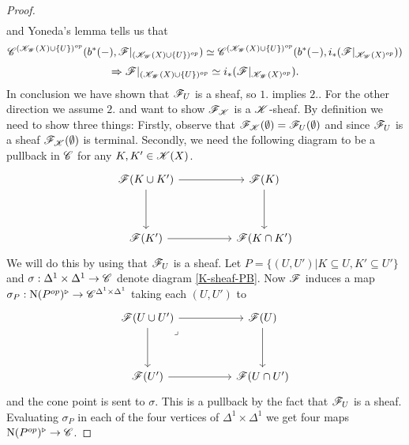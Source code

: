 \documentclass[../../thesis.tex]{subfiles}
\begin{document}
\begin{proof}
\begin{align}
    \end{align}
    and Yoneda's lemma tells us that
    \[\mathscr{C}^{(\mathscr{K}_{\mathscr{W}}(X)\cup \{U\})^{op}}(b^*({-}),\mathscr{F}|_{(\mathscr{K}_{\mathscr{W}}(X)\cup \{U\})^{op}}) \simeq \mathscr{C}^{(\mathscr{K}_{\mathscr{W}}(X)\cup \{U\})^{op}}(b^*({-}), i_*(\mathscr{F}|_{\mathscr{K}_{\mathscr{W}}(X)^{op}}))\]
    \[\Rightarrow \mathscr{F}|_{(\mathscr{K}_{\mathscr{W}}(X)\cup \{U\})^{op}} \simeq i_*(\mathscr{F}|_{\mathscr{K}_{\mathscr{W}}(X)^{op}}).\]
    In conclusion we have shown that $\mathscr{F}_{U}$ is a sheaf, so $1.$ implies $2.$.
    For the other direction we assume $2.$ and want to show $\mathscr{F}_{\mathscr{K}}$ is a $\mathscr{K}$-sheaf. By definition we need to show three things:
    Firstly, observe that $\mathscr{F}_{\mathscr{K}}(\emptyset) = \mathscr{F}_{U}(\emptyset)$ and since $\mathscr{F}_{U}$ is a sheaf $\mathscr{F}_{\mathscr{K}}(\emptyset)$ is terminal.
    Secondly, we need the following diagram to be a pullback in $\mathscr{C}$ for any $K,K' \in \mathscr{K}(X)$.
    \begin{equation}\label{K-sheaf-PB}
        \begin{tikzcd}
            {\F(K \cup K')} && {\F(K)} \\
            \\
            {\F(K')} && {\F(K\cap K')}
            \arrow[from=1-3, to=3-3]
            \arrow[from=3-1, to=3-3]
            \arrow[from=1-1, to=3-1]
            \arrow[from=1-1, to=1-3]
        \end{tikzcd}
    \end{equation}
    We will do this by using that $\mathscr{F}_{U}$ is a sheaf.
    Let $P = \{(U,U') | K \subseteq U, K' \subseteq U'\}$ and $\sigma: \Delta^1\times\Delta^1 \to \mathscr{C}$ denote diagram \ref{K-sheaf-PB}.
    Now $\mathscr{F}$ induces a map $\sigma_P: \mathrm{N}(P^{op})^{\triangleright} \to \mathscr{C}^{\Delta^1\times\Delta^1}$ taking each $(U, U')$ to
    \[
        \begin{tikzcd}
            {\F(U \cup U')} && {\F(U)} \\
            \\
            {\F(U')} && {\F(U\cap U')}
            \arrow[from=1-3, to=3-3]
            \arrow[from=3-1, to=3-3]
            \arrow[from=1-1, to=3-1]
            \arrow["\lrcorner"{anchor=center, pos=0.125}, draw=none, from=1-1, to=3-3]
            \arrow[from=1-1, to=1-3]
        \end{tikzcd}
    \]
    and the cone point is sent to $\sigma$. This is a pullback by the fact that $\mathscr{F}_{U}$ is a sheaf.
    Evaluating $\sigma_P$ in each of the four vertices of $\Delta^1 \times \Delta^1$ we get four maps $\mathrm{N}(P^{op})^{\triangleright} \to \mathscr{C}$.

\end{proof}
\end{document}
